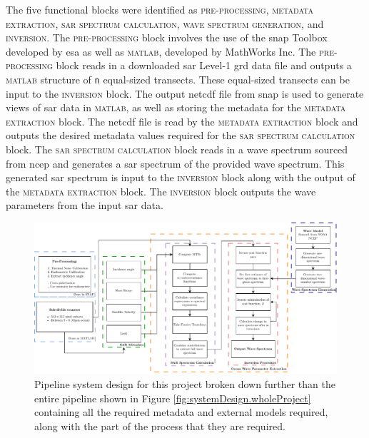 The five functional blocks were identified as \textsc{pre-processing}, \textsc{metadata extraction}, \textsc{\acs{sar} spectrum calculation}, \textsc{wave spectrum generation}, and \textsc{inversion}. The \textsc{pre-processing} block involves the use of the \ac{snap} Toolbox developed by \ac{esa} as well as \textsc{matlab}, developed by MathWorks Inc. The \textsc{pre-processing} block reads in a downloaded \acs{sar} Level-1 \ac{grd} data file and outputs a \textsc{matlab} structure of \lstinline[columns=fixed]{n} equal-sized transects. These equal-sized transects can be input to the \textsc{inversion} block. The output \ac{netcdf} file from \acs{snap} is used to generate views of \acs{sar} data in \textsc{matlab}, as well as storing the metadata for the \textsc{metadata extraction} block. The \ac{netcdf} file is read by the \textsc{metadata extraction} block and outputs the desired metadata values required for the \textsc{\acs{sar} spectrum calculation} block. The \textsc{\acs{sar} spectrum calculation} block reads in a wave spectrum sourced from \ac{ncep} and generates a \acs{sar} spectrum of the provided wave spectrum. This generated \acs{sar} spectrum is input to the \textsc{inversion} block along with the output of the \textsc{metadata extraction} block. The \textsc{inversion} block outputs the wave parameters from the input \acs{sar} data.
\begin{figure}[H]
    \centering
    \includegraphics[width=.95\linewidth]{Figures/PipelineDesign/4022_pipeline.pdf}
    \caption{Pipeline system design for this project broken down further than the entire pipeline shown in Figure \ref{fig:systemDesign.wholeProject} containing all the required metadata and external models required, along with the part of the process that they are required.}
    \label{fig:systemDesign.scope}
\end{figure}
